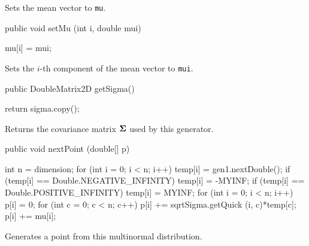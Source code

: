 \begin{tabb}   Sets the mean vector to \texttt{mu}.
\end{tabb}
\begin{htmlonly}
\end{htmlonly}
\begin{code}

   public void setMu (int i, double mui)\begin{hide} {
      mu[i] = mui;
   }\end{hide}
\end{code}
\begin{tabb}   Sets the $i$-th component of the mean vector to \texttt{mui}.
\end{tabb}
\begin{htmlonly}
\end{htmlonly}
\begin{code}

   public DoubleMatrix2D getSigma()\begin{hide} {
      return sigma.copy();
   }\end{hide}
\end{code}
\begin{tabb}   Returns the covariance matrix $\boldsymbol{\Sigma}$
 used by this generator.
\end{tabb}
\begin{htmlonly}
\end{htmlonly}
\begin{code}

   public void nextPoint (double[] p)\begin{hide} {
      int n = dimension;
      for (int i = 0; i < n; i++) {
         temp[i] = gen1.nextDouble();
         if (temp[i] == Double.NEGATIVE_INFINITY)
            temp[i] = -MYINF;
         if (temp[i] == Double.POSITIVE_INFINITY)
            temp[i] = MYINF;
      }
      for (int i = 0; i < n; i++) {
         p[i] = 0;
         for (int c = 0; c < n; c++)
            p[i] += sqrtSigma.getQuick (i, c)*temp[c];
         p[i] += mu[i];
      }
   }\end{hide}
\end{code}
\begin{tabb}   Generates a point from this multinormal distribution.
\end{tabb}
\begin{htmlonly}
\end{htmlonly}

\begin{code}\begin{hide}
}\end{hide}
\end{code}
